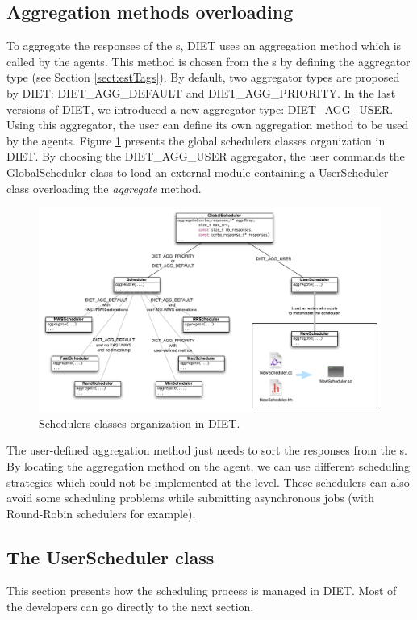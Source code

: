 \subsection{Aggregation methods overloading}
To aggregate the responses of the {\sed}s, DIET uses an aggregation method
which is called by the agents. This method is chosen from the {\sed}s
by defining the aggregator type (see Section \ref{sect:estTags}).
By default, two aggregator types are proposed by DIET:
DIET\_AGG\_DEFAULT and DIET\_AGG\_PRIORITY. In the last versions of DIET, we
introduced a new aggregator type: DIET\_AGG\_USER. Using this
aggregator, the user can define its own aggregation method to be used by
the agents. 
Figure \ref{fig:DIETScheduling} presents the global schedulers classes
organization in DIET. By choosing the DIET\_AGG\_USER aggregator, the user
commands the GlobalScheduler class to load an external module containing
a UserScheduler class overloading the \textit{aggregate} method.
\begin{figure}[h]
  \centering
  \includegraphics[width=16cm]{fig/DIETScheduling}
  \caption{Schedulers classes organization in DIET.\label{fig:DIETScheduling}}
\end{figure}

The user-defined aggregation method just needs to sort the responses from the
{\sed}s. By locating the aggregation method on the agent, we can use different
scheduling strategies which could not be implemented at the {\sed} level. These
schedulers can also avoid some scheduling problems while submitting asynchronous
jobs (with Round-Robin schedulers for example).

\subsection{The UserScheduler class}
This section presents how the scheduling process is managed in DIET.
Most of the developers can go directly to the next section.

